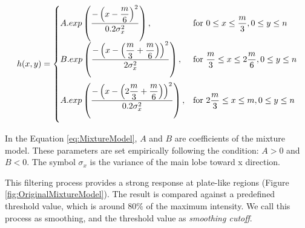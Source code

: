 \documentclass{standalone}
\begin{document}
\begin{equation} \label{eq:MixtureModel}
h(x, y) = 
\begin{cases} 
	A.exp \left(
    	\dfrac{ -\left(x - \dfrac{m}{6} \right)^2 }
        	{ 0.2 \sigma_x^2 } \right),                                      
    	& \mbox{for } 
        	0 \leq x \leq \dfrac{m}{3}, 
            0 \leq y \leq n     
    \\ \vspace{0.2cm}
    B.exp \left( 
    	\dfrac{ -\left(x - 
        			\left( \dfrac{m}{3} + \dfrac{m}{6} \right) 
                \right)^2 }
        	{ 2 \sigma_x^2 } \right),                
        & \mbox{for }
        	\dfrac{m}{3} \leq x \leq 2\dfrac{m}{6}, 
        	0 \leq y \leq n 
    \\ \vspace{0.2cm}
    A.exp \left( 
    	\dfrac{ -\left(x - 
        			\left( 2\dfrac{m}{3} + \dfrac{m}{6} \right) 
                \right)^2 }
        	{ 0.2 \sigma_x^2 } \right),
    	& \mbox{for } 
        	2\dfrac{m}{3} \leq x \leq m, 
            0 \leq y \leq n         
\end{cases}
\end{equation}


In the Equation \ref{eq:MixtureModel}, 
$A$ and $B$ are coefficients of the mixture model. These parameters are set empirically following the condition: $A > 0$ and $B < 0$. 
The symbol $\sigma_x$ is the variance of the main lobe toward x direction. 

This filtering process provides a strong response at plate-like regions (Figure \ref{fig:OriginalMixtureModel}). The result is compared against a predefined threshold value, which is around $80\%$ of the maximum intensity. We call this process as smoothing, and the threshold value as {\it smoothing cutoff}.
\end{document}
